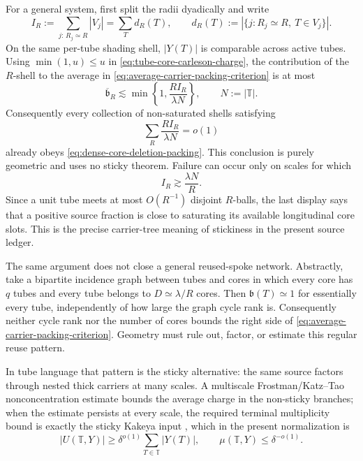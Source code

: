\documentclass[11pt]{article}
\begin{document}
For a general system, first split the radii dyadically and write
\begin{equation}\label{eq:scale-core-incidence-count}
 I_R:=\sum_{j:\,R_j\simeq R}|V_j|
     =\sum_T d_R(T),
 \qquad
 d_R(T):=|\{j:R_j\simeq R,\ T\in V_j\}|.
\end{equation}
On the same per-tube shading shell, \(|Y(T)|\) is comparable across active
tubes.  Using \(\min(1,u)\le u\) in
\eqref{eq:tube-core-carleson-charge}, the contribution of the \(R\)-shell to
the average in \eqref{eq:average-carrier-packing-criterion} is at most
\begin{equation}\label{eq:scale-average-core-charge}
 \boxed{
  \overline{\mathfrak b}_R
  \lesssim
  \min\!\left\{1,\frac{RI_R}{\lambda N}\right\},
  \qquad N:=|\mathbb T|.}
\end{equation}
Consequently every collection of non-saturated shells satisfying
\begin{equation}\label{eq:nonsaturated-core-shell-sum}
 \sum_R\frac{RI_R}{\lambda N}=o(1)
\end{equation}
already obeys \eqref{eq:dense-core-deletion-packing}.  This conclusion is
purely geometric and uses no sticky theorem.  Failure can occur only on
scales for which
\begin{equation}\label{eq:sticky-core-saturation}
 I_R\gtrsim\frac{\lambda N}{R}.
\end{equation}
Since a unit tube meets at most \(O(R^{-1})\) disjoint \(R\)-balls, the last
display says that a positive source fraction is close to saturating its
available longitudinal core slots.  This is the precise carrier-tree meaning
of stickiness in the present source ledger.

The same argument does not close a general reused-spoke network.  Abstractly,
take a bipartite incidence graph between tubes and cores in which every core
has \(q\) tubes and every tube belongs to \(D\simeq\lambda/R\) cores.
Then \(\mathfrak b(T)\simeq1\) for essentially every tube, independently
of how large the graph cycle rank is.  Consequently neither cycle rank nor
the number of cores bounds the right side of
\eqref{eq:average-carrier-packing-criterion}.  Geometry must rule out,
factor, or estimate this regular reuse pattern.

In tube language that pattern is the sticky alternative: the same source
factors through nested thick carriers at many scales.  A multiscale
Frostman/Katz--Tao nonconcentration estimate \cite{KatzTao02} bounds the average charge in the
non-sticky branches; when the estimate persists at every scale, the required
terminal multiplicity bound is exactly the sticky Kakeya input
\cite{StickyKakeya,GuthWangZahl3D}, which in the present normalization is
\begin{equation}\label{eq:terminal-sticky-carrier-gate}
 \boxed{
 |U(\mathbb T,Y)|
 \ge\delta^{o(1)}\sum_{T\in\mathbb T}|Y(T)|,
 \qquad
 \mu(\mathbb T,Y)\le\delta^{-o(1)}.}
\end{equation}
\end{document}
